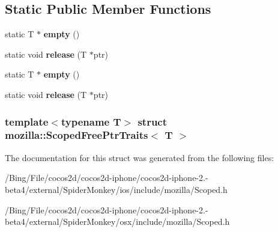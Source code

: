 \subsection*{Static Public Member Functions}
\begin{DoxyCompactItemize}
\item 
\hypertarget{structmozilla_1_1_scoped_free_ptr_traits_adccf409d689058e491d64fea078a1370}{static T $\ast$ {\bfseries empty} ()}\label{structmozilla_1_1_scoped_free_ptr_traits_adccf409d689058e491d64fea078a1370}

\item 
\hypertarget{structmozilla_1_1_scoped_free_ptr_traits_a7d31643d3a1eb0b371a86fb43c7ef344}{static void {\bfseries release} (T $\ast$ptr)}\label{structmozilla_1_1_scoped_free_ptr_traits_a7d31643d3a1eb0b371a86fb43c7ef344}

\item 
\hypertarget{structmozilla_1_1_scoped_free_ptr_traits_adccf409d689058e491d64fea078a1370}{static T $\ast$ {\bfseries empty} ()}\label{structmozilla_1_1_scoped_free_ptr_traits_adccf409d689058e491d64fea078a1370}

\item 
\hypertarget{structmozilla_1_1_scoped_free_ptr_traits_a7d31643d3a1eb0b371a86fb43c7ef344}{static void {\bfseries release} (T $\ast$ptr)}\label{structmozilla_1_1_scoped_free_ptr_traits_a7d31643d3a1eb0b371a86fb43c7ef344}

\end{DoxyCompactItemize}
\subsubsection*{template$<$typename T$>$ struct mozilla\-::\-Scoped\-Free\-Ptr\-Traits$<$ T $>$}



The documentation for this struct was generated from the following files\-:\begin{DoxyCompactItemize}
\item 
/\-Bing/\-File/cocos2d/cocos2d-\/iphone/cocos2d-\/iphone-\/2.-\/beta4/external/\-Spider\-Monkey/ios/include/mozilla/Scoped.\-h\item 
/\-Bing/\-File/cocos2d/cocos2d-\/iphone/cocos2d-\/iphone-\/2.-\/beta4/external/\-Spider\-Monkey/osx/include/mozilla/Scoped.\-h\end{DoxyCompactItemize}
